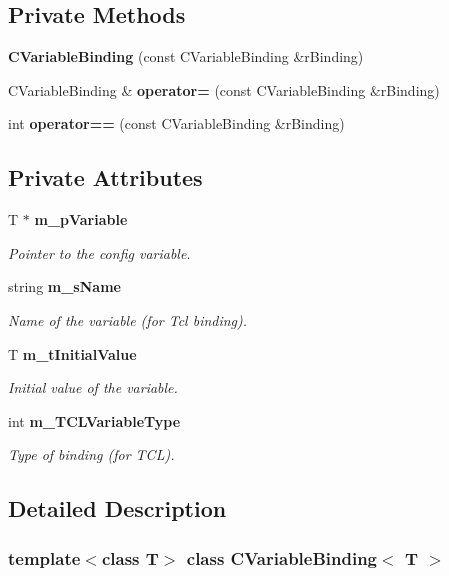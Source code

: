 \subsection*{Private Methods}
\begin{CompactItemize}
\item 
{\bf CVariable\-Binding} (const CVariable\-Binding \&r\-Binding)
\item 
CVariable\-Binding \& {\bf operator=} (const CVariable\-Binding \&r\-Binding)
\item 
int {\bf operator==} (const CVariable\-Binding \&r\-Binding)
\end{CompactItemize}
\subsection*{Private Attributes}
\begin{CompactItemize}
\item 
T $\ast$ {\bf m\_\-p\-Variable}
\begin{CompactList}\small\item\em Pointer to the config variable.\item\end{CompactList}\item 
string {\bf m\_\-s\-Name}
\begin{CompactList}\small\item\em Name of the variable (for Tcl binding).\item\end{CompactList}\item 
T {\bf m\_\-t\-Initial\-Value}
\begin{CompactList}\small\item\em Initial value of the variable.\item\end{CompactList}\item 
int {\bf m\_\-TCLVariable\-Type}
\begin{CompactList}\small\item\em Type of binding (for TCL).\item\end{CompactList}\end{CompactItemize}


\subsection{Detailed Description}
\subsubsection*{template$<$class T$>$ class CVariable\-Binding$<$ T $>$}

